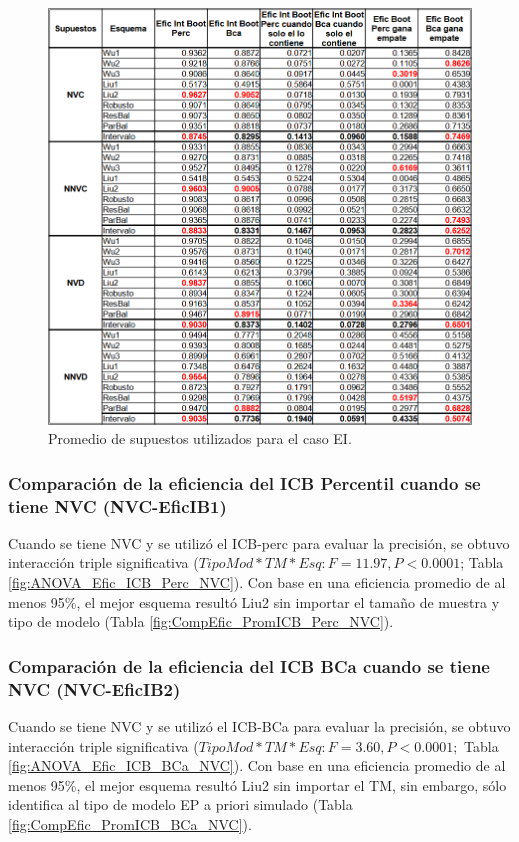 \begin{figure}[ht] 
	\centering 
	\includegraphics[width=0.80\linewidth]{img/EI_Prom_Supuestos.png} 
	\caption{Promedio de supuestos utilizados para el caso EI.} 
	\label{fig:PromSupuUtiliEI}
\end{figure}
\FloatBarrier







\subsubsection{Comparación de la eficiencia del ICB Percentil cuando se tiene NVC (NVC-EficIB1)}

Cuando se tiene NVC y se utilizó el ICB-perc para evaluar la precisión, se obtuvo interacción triple significativa ($TipoMod*TM*Esq: F=11.97, P<0.0001$; Tabla \ref{fig:ANOVA_Efic_ICB_Perc_NVC}). Con base en una eficiencia promedio de al menos 95\%, el mejor esquema resultó Liu2 sin importar el tamaño de muestra y tipo de modelo (Tabla \ref{fig:CompEfic_PromICB_Perc_NVC}).\\



\subsubsection{Comparación de la eficiencia del ICB BCa cuando se tiene NVC (NVC-EficIB2)}

Cuando se tiene NVC y se utilizó el ICB-BCa para evaluar la precisión, se obtuvo interacción triple significativa ($TipoMod*TM*Esq: F=3.60, P<0.0001;$ Tabla \ref{fig:ANOVA_Efic_ICB_BCa_NVC}). Con base en una eficiencia promedio de al menos 95\%, el mejor esquema resultó Liu2 sin importar el TM, sin embargo, sólo identifica al tipo de modelo EP a priori simulado (Tabla \ref{fig:CompEfic_PromICB_BCa_NVC}).\\


